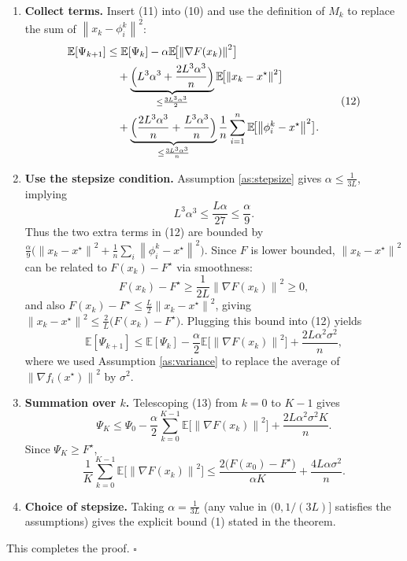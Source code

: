 \documentclass{article}
\newcommand{\E}{\mathbb{E}}
\newcommand{\norm}[1]{\left\lVert#1\right\rVert}
\begin{document}
\begin{enumerate}
\item[Step 10.] \textbf{Collect terms.}  
Insert (11) into (10) and use the definition of $M_k$ to replace the sum of $\norm{x_k-\phi_i^{k}}^{2}$:
\[
\begin{aligned}
\E[\Psi_{k+1}]
&\le \E[\Psi_k] -\alpha\E\!\bigl[\norm{\nabla F(x_k)}^{2}\bigr] \\
&\quad +\underbrace{\Bigl(L^{3}\alpha^{3}+\frac{2L^{3}\alpha^{3}}{n}\Bigr)}_{\le \frac{3L^{3}\alpha^{3}}{2}}
      \E\!\bigl[\norm{x_k-x^{\star}}^{2}\bigr] \\
&\quad +\underbrace{\Bigl(\frac{2L^{3}\alpha^{3}}{n}+\frac{L^{3}\alpha^{3}}{n}\Bigr)}_{\le \frac{3L^{3}\alpha^{3}}{n}}
      \frac{1}{n}\sum_{i=1}^{n}\E\!\bigl[\norm{\phi_i^{k}-x^{\star}}^{2}\bigr].
\end{aligned}
\tag{12}
\]

\item[Step 11.] \textbf{Use the stepsize condition.}  
Assumption \ref{as:stepsize} gives $\alpha\le \frac{1}{3L}$, implying
\[
L^{3}\alpha^{3}\le \frac{L\alpha}{27}\le \frac{\alpha}{9}.
\]
Thus the two extra terms in (12) are bounded by $\frac{\alpha}{9}\bigl(\norm{x_k-x^{\star}}^{2}+ \frac{1}{n}\sum_i\norm{\phi_i^{k}-x^{\star}}^{2}\bigr)$.  
Since $F$ is lower bounded, $\norm{x_k-x^{\star}}^{2}$ can be related to $F(x_k)-F^{\star}$ via smoothness:
\[
F(x_k)-F^{\star}\ge \frac{1}{2L}\norm{\nabla F(x_k)}^{2}
               \ge 0,
\]
and also $F(x_k)-F^{\star}\le \frac{L}{2}\norm{x_k-x^{\star}}^{2}$, giving $\norm{x_k-x^{\star}}^{2}\le \frac{2}{L}\bigl(F(x_k)-F^{\star}\bigr)$.  
Plugging this bound into (12) yields
\[
\E[\Psi_{k+1}]
\le \E[\Psi_k] -\frac{\alpha}{2}\E\!\bigl[\norm{\nabla F(x_k)}^{2}\bigr]
   +\frac{2L\alpha^{2}\sigma^{2}}{n},
\tag{13}
\]
where we used Assumption \ref{as:variance} to replace the average of $\norm{\nabla f_i(x^{\star})}^{2}$ by $\sigma^{2}$.

\item[Step 12.] \textbf{Summation over $k$.}  
Telescoping (13) from $k=0$ to $K-1$ gives
\[
\Psi_{K}\le \Psi_{0}
          -\frac{\alpha}{2}\sum_{k=0}^{K-1}\E\!\bigl[\norm{\nabla F(x_k)}^{2}\bigr]
          +\frac{2L\alpha^{2}\sigma^{2}K}{n}.
\]
Since $\Psi_{K}\ge F^{\star}$,
\[
\frac{1}{K}\sum_{k=0}^{K-1}\E\!\bigl[\norm{\nabla F(x_k)}^{2}\bigr]
\le \frac{2\bigl(F(x_0)-F^{\star}\bigr)}{\alpha K}
   +\frac{4L\alpha\sigma^{2}}{n}.
\tag{14}
\]

\item[Step 13.] \textbf{Choice of stepsize.}  
Taking $\alpha = \frac{1}{3L}$ (any value in $(0,1/(3L)]$ satisfies the assumptions) gives the explicit bound (1) stated in the theorem.
\end{enumerate}
This completes the proof. \hfill $\square$
\end{document}
